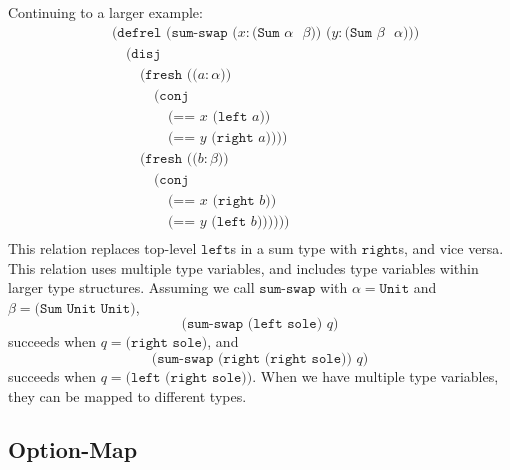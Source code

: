 \documentclass{report}
\theoremstyle{definition}
\begin{document}
Continuing to a larger example:
\begin{equation}
\begin{aligned}
	& \texttt{(defrel (sum-swap (\(x : \texttt{(Sum \(\alpha\) \(\beta\))}\)) (\(y : \texttt{(Sum \(\beta\) \(\alpha\))}\)))} \\
	& \quad \texttt{(disj} \\
	& \quad \quad \texttt{(fresh ((\(a : \alpha\)))} \\
	& \quad \quad \quad \texttt{(conj} \\
	& \quad \quad \quad \quad \texttt{(== \(x\) (left \(a\)))} \\
	& \quad \quad \quad \quad \texttt{(== \(y\) (right \(a\)))))} \\
	& \quad \quad \texttt{(fresh ((\(b : \beta\)))} \\
	& \quad \quad \quad \texttt{(conj} \\
	& \quad \quad \quad \quad \texttt{(== \(x\) (right \(b\)))} \\
	& \quad \quad \quad \quad \texttt{(== \(y\) (left \(b\)))))))} \\
\end{aligned}
\end{equation}
This relation replaces top-level \(\texttt{left}\)s in a sum type with \(\texttt{right}\)s, and vice versa.
This relation uses multiple type variables, and includes type variables within larger type structures.
Assuming we call \(\texttt{sum-swap}\) with \(\alpha = \texttt{Unit}\) and \(\beta = \texttt{(Sum Unit Unit)}\),
\begin{equation}
	\texttt{(sum-swap (left sole) \(q\))} 
\end{equation}
succeeds when \(q = \texttt{(right sole)}\), and
\begin{equation}
	\texttt{(sum-swap (right (right sole)) \(q\))} 
\end{equation}
succeeds when \(q = \texttt{(left (right sole))}\).
When we have multiple type variables, they can be mapped to different types.

\subsection{Option-Map}
\end{document}
